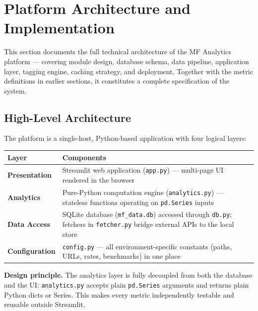 \documentclass[12pt, a4paper]{article}
\begin{document}
\section{Platform Architecture and Implementation}
\label{sec:architecture}

This section documents the full technical architecture of the MF Analytics
platform — covering module design, database schema, data pipeline, application
layer, tagging engine, caching strategy, and deployment.  Together with the
metric definitions in earlier sections, it constitutes a complete specification
of the system.

\subsection{High-Level Architecture}

The platform is a single-host, Python-based application with four logical
layers:

\begin{center}
\begin{tabular}{@{}p{}p{}@{}}
\toprule
\textbf{Layer} & \textbf{Components} \\
\midrule
\textbf{Presentation} & Streamlit web application (\texttt{app.py}) —
  multi-page UI rendered in the browser \\[4pt]
\textbf{Analytics} & Pure-Python computation engine (\texttt{analytics.py}) —
  stateless functions operating on \texttt{pd.Series} inputs \\[4pt]
\textbf{Data Access} & SQLite database (\texttt{mf\_data.db}) accessed through
  \texttt{db.py}; fetchers in \texttt{fetcher.py} bridge external APIs to the
  local store \\[4pt]
\textbf{Configuration} & \texttt{config.py} — all environment-specific
  constants (paths, URLs, rates, benchmarks) in one place \\
\bottomrule
\end{tabular}
\end{center}

\begin{mdframed}[backgroundcolor=lightgray,linecolor=accent,linewidth=1.5pt,
                 topline=false,bottomline=false,rightline=false]
\textbf{Design principle.}
The analytics layer is fully decoupled from both the database and the UI:
\texttt{analytics.py} accepts plain \texttt{pd.Series} arguments and returns
plain Python dicts or Series.  This makes every metric independently testable
and reusable outside Streamlit.
\end{mdframed}
\end{document}
